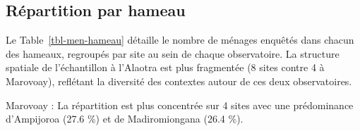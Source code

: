 \documentclass[
  french,
  letterpaper,
]{report}
\begin{document}
\begin{table}

\caption{\label{tbl-denombrement}Dénombrement et taux de sondage par
observatoire}

\centering{

}

\end{table}%

\subsection{Répartition par hameau}\label{ruxe9partition-par-hameau}

Le Table~\ref{tbl-men-hameau} détaille le nombre de ménages enquêtés
dans chacun des hameaux, regroupés par site au sein de chaque
observatoire. La structure spatiale de l'échantillon à l'Alaotra est
plus fragmentée (8 sites contre 4 à Marovoay), reflétant la diversité
des contextes autour de ces deux observatoires.

Marovoay : La répartition est plus concentrée sur 4 sites avec une
prédominance d'Ampijoroa (27.6 \%) et de Madiromiongana (26.4 \%).
\end{document}
